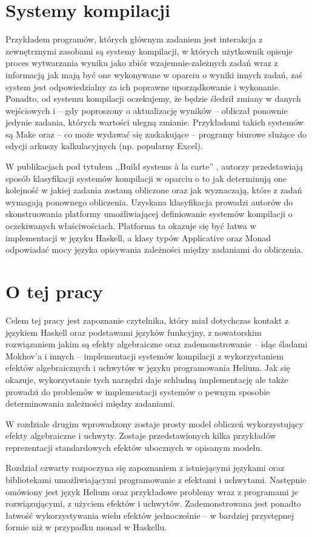 \section{Systemy kompilacji}

Przykładem programów, których głównym zadaniem jest interakcja z zewnętrznymi zasobami są systemy kompilacji, w których użytkownik opisuje proces wytwarzania wyniku jako zbiór wzajemnie-zależnych zadań wraz z informacją jak mają być one wykonywane w oparciu o wyniki innych zadań, zaś system jest odpowiedzialny za ich poprawne uporządkowanie i wykonanie. Ponadto, od systemu kompilacji oczekujemy, że będzie śledził zmiany w danych wejściowych i -- gdy poproszony o aktualizację wyników -- obliczał ponownie jedynie zadania, których wartości ulegną zmianie. Przykładami takich systemów są Make oraz -- co może wydawać się zaskakujące -- programy biurowe służące do edycji arkuszy kalkulacyjnych (np. popularny Excel).

W publikacjach pod tytułem ,,Build systems {\`a} la carte'' \cite{mokhov2018build, mokhov2020build}, autorzy przedstawiają sposób klasyfikacji systemów kompilacji w oparciu o to jak determinują one kolejność w jakiej zadania zostaną obliczone oraz jak wyznaczają, które z zadań wymagają ponownego obliczenia. Uzyskana klasyfikacja prowadzi autorów do skonstruowania platformy umożliwiającej definiowanie systemów kompilacji o oczekiwanych właściwościach. Platforma ta okazuje się być łatwa w implementacji w języku Haskell, a klasy typów Applicative oraz Monad odpowiadać mocy języka opisywania zależności między zadaniami do obliczenia.

\section{O tej pracy}

Celem tej pracy jest zapoznanie czytelnika, który miał dotychczas kontakt z językiem Haskell oraz podstawami języków funkcyjny, z nowatorskim rozwiązaniem jakim są efekty algebraiczne oraz zademonstrowanie -- idąc śladami Mokhov'a i innych \cite{mokhov2018build} -- implementacji systemów kompilacji z wykorzystaniem efektów algebraicznych i uchwytów w języku programowania Helium. Jak się okazuje, wykorzystanie tych narzędzi daje schludną implementację ale także prowadzi do problemów w implementacji systemów o pewnym sposobie determinowania zależności między zadaniami.

W rozdziale drugim wprowadzony zostaje prosty model obliczeń wykorzystujący efekty algebraiczne i uchwyty. Zostaje przedstawionych kilka przykładów reprezentacji standardowych efektów ubocznych w opisanym modelu.

Rozdział czwarty rozpoczyna się zapoznaniem z istniejącymi językami oraz bibliotekami umożliwiającymi programowanie z efektami i uchwytami. Następnie omówiony jest język Helium oraz przykładowe problemy wraz z programami je rozwiązującymi, z użyciem efektów i uchwytów. Zademonstrowana jest ponadto łatwość wykorzystywania wielu efektów jednocześnie -- w bardziej przystępnej formie niż w przypadku monad w Haskellu.

